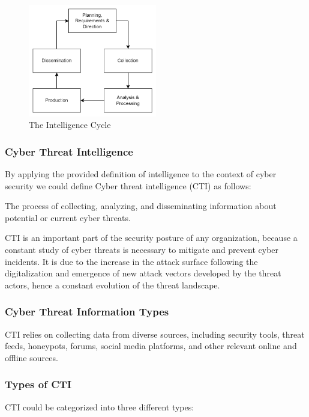 \begin{figure}[ht]
    \centering
    \includegraphics[width=0.5\textwidth]{diagrams/background/intelligence-cycle.png}
    \caption{The Intelligence Cycle \cite{lee_cyber_2023}}
    \label{fig:cti-lifecycle}
\end{figure}

\subsubsection{Cyber Threat Intelligence}
By applying the provided definition of intelligence to the context of cyber security we could define Cyber threat intelligence (CTI) as follows:

\smallskip
The process of collecting, analyzing, and disseminating information about potential or current cyber threats. 

CTI is an important part of the security posture of any organization, because a constant study of cyber threats is necessary to mitigate and prevent cyber incidents.
It is due to the increase in the attack surface following the digitalization and emergence of new attack vectors developed by the threat actors, hence a constant evolution of the threat landscape.

\subsubsection{Cyber Threat Information Types}
CTI relies on collecting data from diverse sources, including security tools, threat feeds, honeypots, forums, social media platforms, and other relevant online and offline sources. 

\subsubsection{Types of CTI}
CTI could be categorized into three different types:

